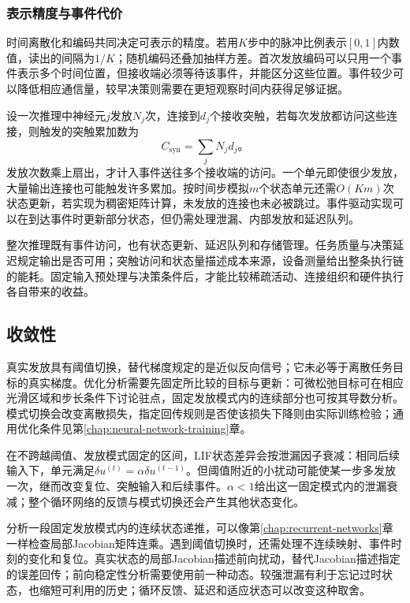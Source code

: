 \subsubsection{表示精度与事件代价}
\label{sec:snn-cost}

时间离散化和编码共同决定可表示的精度。若用$K$步中的脉冲比例表示$[0,1]$内数值，读出的间隔为$1/K$；随机编码还叠加抽样方差。首次发放编码可以只用一个事件表示多个时间位置，但接收端必须等待该事件，并能区分这些位置。事件较少可以降低相应通信量，较早决策则需要在更短观察时间内获得足够证据。

设一次推理中神经元$j$发放$N_j$次，连接到$d_j$个接收突触，若每次发放都访问这些连接，则触发的突触累加数为
\begin{equation}
  C_{\mathrm{syn}}=\sum_jN_jd_j\text{。}
  \label{eq:snn-event-cost}
\end{equation}
发放次数乘上扇出，才计入事件送往多个接收端的访问。一个单元即使很少发放，大量输出连接也可能触发许多累加。按时间步模拟$m$个状态单元还需$O(Km)$次状态更新，若实现为稠密矩阵计算，未发放的连接也未必被跳过。事件驱动实现可以在到达事件时更新部分状态，但仍需处理泄漏、内部发放和延迟队列。

整次推理既有事件访问，也有状态更新、延迟队列和存储管理。任务质量与决策延迟规定输出是否可用；突触访问和状态量描述成本来源，设备测量给出整条执行链的能耗。固定输入预处理与决策条件后，才能比较稀疏活动、连接组织和硬件执行各自带来的收益。

\subsection{收敛性}
\label{sec:snn-convergence}

真实发放具有阈值切换，替代梯度规定的是近似反向信号；它未必等于离散任务目标的真实梯度。优化分析需要先固定所比较的目标与更新：可微松弛目标可在相应光滑区域和步长条件下讨论驻点，固定发放模式内的连续部分也可按其导数分析。模式切换会改变离散损失，指定回传规则是否使该损失下降则由实际训练检验；通用优化条件见第\ref{chap:neural-network-training}章。

在不跨越阈值、发放模式固定的区间，LIF状态差异会按泄漏因子衰减：相同后续输入下，单元满足$\delta u^{(t)}=\alpha\delta u^{(t-1)}$。但阈值附近的小扰动可能使某一步多发放一次，继而改变复位、突触输入和后续事件。$\alpha<1$给出这一固定模式内的泄漏衰减；整个循环网络的反馈与模式切换还会产生其他状态变化。

分析一段固定发放模式内的连续状态递推，可以像第\ref{chap:recurrent-networks}章一样检查局部Jacobian矩阵连乘。遇到阈值切换时，还需处理不连续映射、事件时刻的变化和复位。真实状态的局部Jacobian描述前向扰动，替代Jacobian描述指定的误差回传；前向稳定性分析需要使用前一种动态。较强泄漏有利于忘记过时状态，也缩短可利用的历史；循环反馈、延迟和适应状态可以改变这种取舍。

